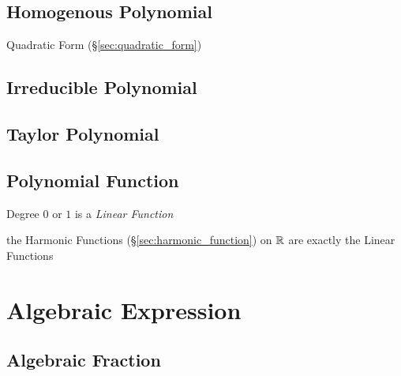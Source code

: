 \subsection{Homogenous Polynomial}\label{sec:homogenous_polynomial}

Quadratic Form (\S\ref{sec:quadratic_form})



\subsection{Irreducible Polynomial}\label{sec:irreducible_polynomial}

\subsection{Taylor Polynomial}\label{sec:taylor_polynomial}

\subsection{Polynomial Function}\label{sec:polynomial_function}

Degree $0$ or $1$ is a \emph{Linear Function}

the Harmonic Functions (\S\ref{sec:harmonic_function}) on $\mathbb{R}$ are
exactly the Linear Functions



\section{Algebraic Expression}\label{sec:algebraic_expression}

\subsection{Algebraic Fraction}\label{sec:algebraic_fraction}

